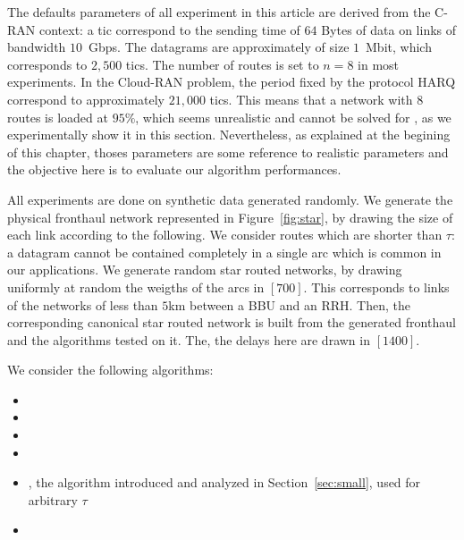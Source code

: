   The defaults parameters of all experiment in this article are derived from the C-RAN context: a tic correspond to the sending time of $64$ Bytes of data on links of bandwidth $10$~Gbps. The datagrams are approximately of size $1$~Mbit, which corresponds to $2,500$ tics. The number of routes is set to $n = 8$ in most experiments. In the Cloud-RAN problem, the period fixed by the protocol HARQ correspond to approximately $21,000$ tics. This means that a network with $8$ routes is loaded at $95\%$, which seems unrealistic and cannot be solved for \pazl, as we experimentally show it in this section. Nevertheless, as explained at the begining of this chapter, thoses parameters are some reference to realistic parameters and the objective here is to evaluate our algorithm performances.

     All experiments are done on synthetic data generated randomly. We generate the physical fronthaul
     network represented in Figure~\ref{fig:star}, by drawing the size of each link according 
     to the following. We consider routes which are shorter than $\tau$: a datagram cannot be contained completely in a single arc which is common in our applications. We generate random star routed networks, by drawing uniformly at random the weigths of the arcs in $[700]$. This corresponds to links of the networks of less than $5$km between a BBU and an RRH. Then, the corresponding canonical star routed network is built from the generated fronthaul and the algorithms tested on it. The, the delays here are drawn in $[1400]$.

     We consider the following algorithms:
\begin{itemize}
  \item \firstfit
  \item \metaoffset
  \item \compactpair
  \item \compactfit
  \item \greedyuniform, the algorithm introduced and analyzed in Section~\ref{sec:small}, used for arbitrary $\tau$
  \item \exactresolution 
\end{itemize}


